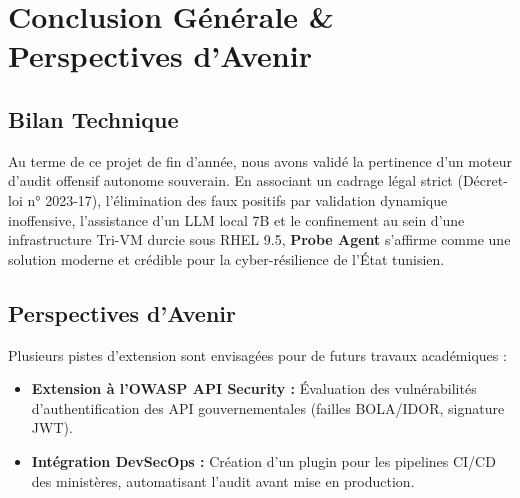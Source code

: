 \documentclass[11pt,a4paper,oneside]{article}
\begin{document}
\section{Conclusion Générale \& Perspectives d'Avenir}

\subsection{Bilan Technique}
Au terme de ce projet de fin d'année, nous avons validé la pertinence d'un moteur d'audit offensif autonome souverain. En associant un cadrage légal strict (Décret-loi n° 2023-17), l'élimination des faux positifs par validation dynamique inoffensive, l'assistance d'un LLM local 7B et le confinement au sein d'une infrastructure Tri-VM durcie sous RHEL 9.5, \textbf{Probe Agent} s'affirme comme une solution moderne et crédible pour la cyber-résilience de l'État tunisien.

\subsection{Perspectives d'Avenir}
Plusieurs pistes d'extension sont envisagées pour de futurs travaux académiques :
\begin{itemize}
    \item \textbf{Extension à l'OWASP API Security :} Évaluation des vulnérabilités d'authentification des API gouvernementales (failles BOLA/IDOR, signature JWT).
    \item \textbf{Intégration DevSecOps :} Création d'un plugin pour les pipelines CI/CD des ministères, automatisant l'audit avant mise en production.
\end{itemize}

\vspace{0.4cm}
\end{document}
